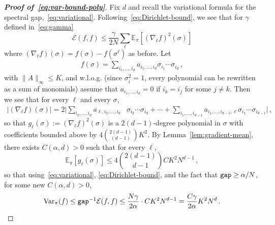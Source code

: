 \documentclass[reqno,11pt]{amsart}
\numberwithin{equation}{section}
\theoremstyle{definition}{
\newtheorem{example}[theorem]{Example}
\newtheorem{definition}[theorem]{Definition}
\newtheorem*{definition*}{Definition}
\newtheorem{problem}[theorem]{Problem}
\newtheorem{question}[theorem]{Question}
\newtheorem{remark}[theorem]{Remark}
}
\newcommand{\gap}{\text{\tt{gap}}}
\begin{document}
\begin{proof}[\emph{\textbf{Proof of~\eqref{eq:var-bound-poly}}}]
Fix $d$ and recall the variational formula for the spectral gap,~\eqref{eq:variational}. Following~\eqref{eq:Dirichlet-bound}, we see that for $\gamma$ defined in~\eqref{eq:gamma}
\[\mathcal E(f,f)\leq \frac \gamma{2N} \sum_\ell \mathbb E_\pi \left[ (\nabla_\ell f)^2 (\sigma)\right]
\] where $(\nabla_\ell f)(\sigma)= f(\sigma)-f(\sigma^\ell)$ as before.  Let 
\begin{align*}
f(\sigma)=\sum_{i_1,...,i_d} a_{i_1,...,i_d} \sigma_{i_1} \cdots \sigma_{i_d}\,,
\end{align*} 
with $\|A\|_\infty \leq K$, and w.l.o.g. (since $\sigma_i^2 =1$, every polynomial can be rewritten as a sum of monomials) assume that $a_{i_1,...,i_d} = 0$ if $i_k = i_j$ for some $j\neq k$. Then we see that for every $\ell$ and every $\sigma$, 
\begin{align*}
|(\nabla_\ell f)(\sigma)|= 2\bigg |\sum_{i_2,...,i_d}  a_{\ell, i_2,...,i_d} & \sigma_{i_2} \cdots \sigma_{i_d} + \cdots + \sum _{i_1,...,i_{d-1}} a_{i_1,...,i_{d-1},\ell} \sigma_{i_1} \cdots \sigma_{i_{d-1}}\bigg|\,,
\end{align*} 
so that $g_\ell(\sigma):= (\nabla_\ell f)^2(\sigma)$ is a $2(d-1)$-degree polynomial in $\sigma$ with coefficients bounded above by $4\binom {2(d-1) }{(d-1)}K^2$. By Lemma~\ref{lem:gradient-mean}, there exists $C(\alpha,d)>0$ such that for every $\ell$,
\[ \mathbb E_{\pi} [g_\ell(\sigma)] \leq 4\binom {2(d-1)}{d-1}C K^{2} N^{d-1}\,,
\]
so that using~\eqref{eq:variational}, \eqref{eq:Dirichlet-bound}, and the fact that $\gap \geq \alpha/N$, for some new $C(\alpha,d)>0$,
\[
\mbox{Var}_\pi (f) \leq \gap^{-1} \mathcal E(f,f)\leq \frac{N \gamma}{2\alpha}\cdot C K^2 N^{d-1}= \frac {C \gamma}{2\alpha} K^2 N^d\,. \qedhere
\]
\end{proof}
\end{document}
